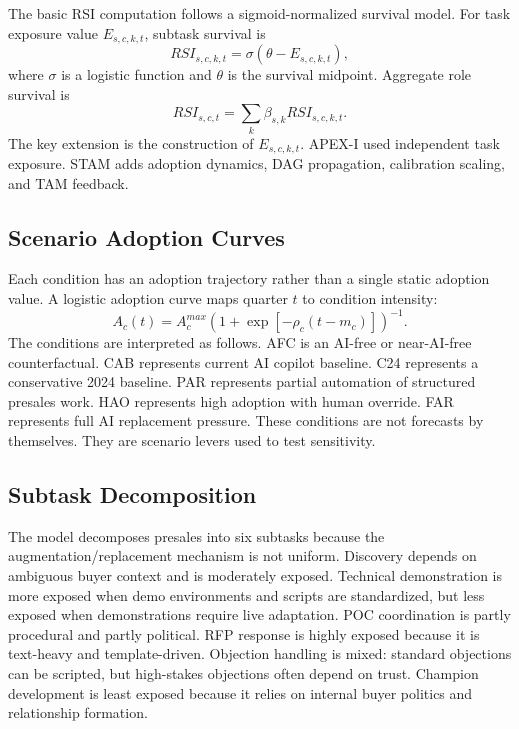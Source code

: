 \documentclass[10pt,conference]{IEEEtran}
\begin{document}
The basic RSI computation follows a sigmoid-normalized survival model. For task exposure value $E_{s,c,k,t}$, subtask survival is
\begin{equation}
RSI_{s,c,k,t}=\sigma(\theta - E_{s,c,k,t}),
\end{equation}
where $\sigma$ is a logistic function and $\theta$ is the survival midpoint. Aggregate role survival is
\begin{equation}
RSI_{s,c,t}=\sum_k \beta_{s,k} RSI_{s,c,k,t}.
\end{equation}
The key extension is the construction of $E_{s,c,k,t}$. APEX-I used independent task exposure. STAM adds adoption dynamics, DAG propagation, calibration scaling, and TAM feedback.

\subsection{Scenario Adoption Curves}
Each condition has an adoption trajectory rather than a single static adoption value. A logistic adoption curve maps quarter $t$ to condition intensity:
\begin{equation}
A_c(t)=A^{max}_c(1+\exp[-\rho_c(t-m_c)])^{-1}.
\end{equation}
The conditions are interpreted as follows. AFC is an AI-free or near-AI-free counterfactual. CAB represents current AI copilot baseline. C24 represents a conservative 2024 baseline. PAR represents partial automation of structured presales work. HAO represents high adoption with human override. FAR represents full AI replacement pressure. These conditions are not forecasts by themselves. They are scenario levers used to test sensitivity.

\subsection{Subtask Decomposition}
The model decomposes presales into six subtasks because the augmentation/replacement mechanism is not uniform. Discovery depends on ambiguous buyer context and is moderately exposed. Technical demonstration is more exposed when demo environments and scripts are standardized, but less exposed when demonstrations require live adaptation. POC coordination is partly procedural and partly political. RFP response is highly exposed because it is text-heavy and template-driven. Objection handling is mixed: standard objections can be scripted, but high-stakes objections often depend on trust. Champion development is least exposed because it relies on internal buyer politics and relationship formation.
\end{document}
